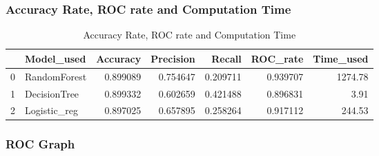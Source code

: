 \documentclass[11pt,a4paper]{article}
\begin{document}
    \subsubsection{Accuracy Rate, ROC rate and Computation Time}
    \begin{table}[ht]
        \centering
        \begin{tabular}{llrrrrr}
        {} &    Model\_used &  Accuracy &  Precision &    Recall &  ROC\_rate &  Time\_used \\
        \hline \hline
        0 &  RandomForest &  0.899089 &   0.754647 &  0.209711 &  0.939707 &    1274.78 \\
        1 &  DecisionTree &  0.899332 &   0.602659 &  0.421488 &  0.896831 &       3.91 \\
        2 &  Logistic\_reg &  0.897025 &   0.657895 &  0.258264 &  0.917112 &     244.53 \\
        \end{tabular}
        \caption{Accuracy Rate, ROC rate and Computation Time}
        \label{tab:comparison}
    \end{table}

    
    \subsubsection{ROC Graph}
    
\end{document}
